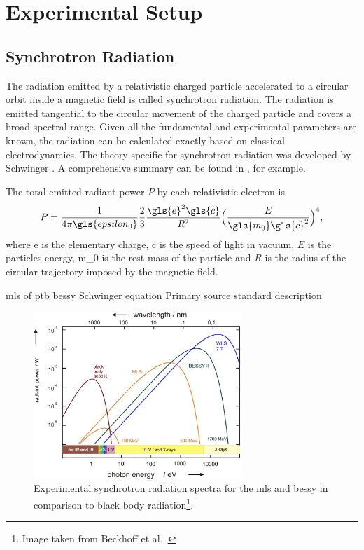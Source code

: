 \chapter{Experimental Setup}
\section{Synchrotron Radiation}
The radiation emitted by a relativistic charged particle accelerated to a circular orbit inside a magnetic field is called synchrotron radiation. The radiation is emitted tangential to the circular movement of the charged particle and covers a broad spectral range. Given all the fundamental and experimental parameters are known, the radiation can be calculated exactly based on classical electrodynamics. The theory specific for synchrotron radiation was developed by Schwinger \cite{schwinger_classical_1949}. A comprehensive summary can be found in \cite{munro_chapter_1987}, for example.

The total emitted radiant power $P$ by each relativistic electron is
\begin{align}
 P = \frac{1}{4 \pi \gls{epsilon_0}} \frac{2}{3} \frac{\gls{e}^2 \gls{c}}{R^2}\Big( \frac{E}{\gls{m_0} \gls{c}^2}\Big)^4 \text{,}
\end{align}
where \gls{e} is the elementary charge, \gls{c} is the speed of light in vacuum, $E$ is the particles energy, \gls{m_0} is the rest mass of the particle and $R$ is the radius of the circular trajectory imposed by the magnetic field.

\Gls{mls} \cite{brandt_metrology_2007} of \gls{ptb}
\Gls{bessy}
Schwinger equation \cite{schwinger_classical_1949}
Primary source standard \cite{thornagel_electron_2001}
description \cite{munro_chapter_1987}
\begin{figure}
 \includegraphics[width=0.7\textwidth]{img/exp-bessy-dipole-spectrum.jpeg}
 \caption[Experimental synchrotron radiation spectra]{Experimental synchrotron radiation spectra for the \gls{mls} and \gls{bessy} in comparison to black body radiation\footnote{Image taken from Beckhoff et al.~\cite{beckhoff_quarter-century_2009}}.}
 \label{ch_exp:fig_experimental_synchrotron_spectra}
\end{figure}


